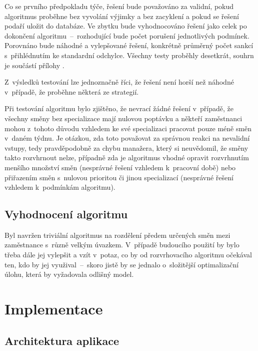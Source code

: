 \documentclass[twoside]{ctuthesis}
\begin{document}
Co se prvního předpokladu týče, řešení bude považováno za validní, pokud algoritmus proběhne bez vyvolání výjimky a bez zacyklení a pokud se řešení podaří uložit do databáze. Ve zbytku bude vyhodnocováno řešení jako celek po dokončení algoritmu~–~rozhodující bude počet porušení jednotlivých podmínek. Porovnáno bude náhodné a vylepšované řešení, konkrétně průměrný počet sankcí s~přihlédnutím ke standardní odchylce. Všechny testy proběhly desetkrát, souhrn je součástí přílohy .

Z~výsledků testování lze jednoznačně říci, že řešení není horší než náhodné v~případě, že proběhne některá ze strategií.

Při testování algoritmu bylo zjištěno, že nevrací žádné řešení v~případě, že všechny směny bez specializace mají nulovou poptávku a někteří zaměstnanci mohou z~tohoto důvodu vzhledem ke své specializaci pracovat pouze méně směn v~daném týdnu. Je otázkou, zda toto považovat za správnou reakci na nevalidní vstupy, tedy pravděpodobně za chybu manažera, který si neuvědomil, že směny takto rozvhrnout nelze, případně zda je algoritmus vhodné opravit rozvrhnutím menšího množství směn (nesprávné řešení vzhledem k~pracovní době) nebo přiřazením směn s~nulovou prioritou či jinou specializací (nesprávné řešení vzhledem k~podmínkám algoritmu).



\section{Vyhodnocení algoritmu}

Byl navržen triviální algoritmus na rozdělení předem určených směn mezi zaměstnance s~různě velkým úvazkem. V~případě budoucího použití by bylo třeba dále jej vylepšit a vzít v~potaz, co by od rozvrhovacího algoritmu očekával ten, kdo by jej využival~–~skoro jistě by se jednalo o~složitější optimalizační úlohu, která by vyžadovala odlišný model.


\chapter{Implementace}

\section{Architektura aplikace}
\end{document}
